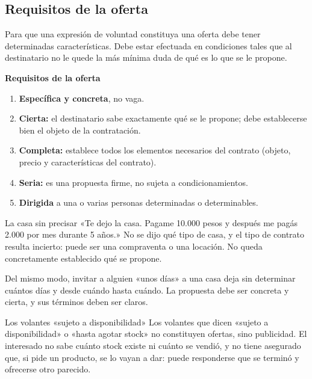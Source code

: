 \documentclass[12pt,oneside]{book}
\begin{document}
\subsection{Requisitos de la oferta}

Para que una expresión de voluntad constituya una oferta debe tener determinadas características. Debe estar efectuada en condiciones tales que al destinatario no le quede la más mínima duda de qué es lo que se le propone.

\begin{important}
\textbf{Requisitos de la oferta}
\begin{enumerate}
    \item \textbf{Específica y concreta}, no vaga.
    \item \textbf{Cierta:} el destinatario sabe exactamente qué se le propone; debe establecerse bien el objeto de la contratación.
    \item \textbf{Completa:} establece todos los elementos necesarios del contrato (objeto, precio y características del contrato).
    \item \textbf{Seria:} es una propuesta firme, no sujeta a condicionamientos.
    \item \textbf{Dirigida} a una o varias personas determinadas o determinables.
\end{enumerate}
\end{important}

\begin{example}{La casa sin precisar}
«Te dejo la casa. Pagame 10.000 pesos y después me pagás 2.000 por mes durante 5 años.» No se dijo qué tipo de casa, y el tipo de contrato resulta incierto: puede ser una compraventa o una locación. No queda concretamente establecido qué se propone.

Del mismo modo, invitar a alguien «unos días» a una casa deja sin determinar cuántos días y desde cuándo hasta cuándo. La propuesta debe ser concreta y cierta, y sus términos deben ser claros.
\end{example}

\begin{example}{Los volantes «sujeto a disponibilidad»}
Los volantes que dicen «sujeto a disponibilidad» o «hasta agotar stock» no constituyen ofertas, sino publicidad. El interesado no sabe cuánto stock existe ni cuánto se vendió, y no tiene asegurado que, si pide un producto, se lo vayan a dar: puede responderse que se terminó y ofrecerse otro parecido.
\end{example}
\end{document}

